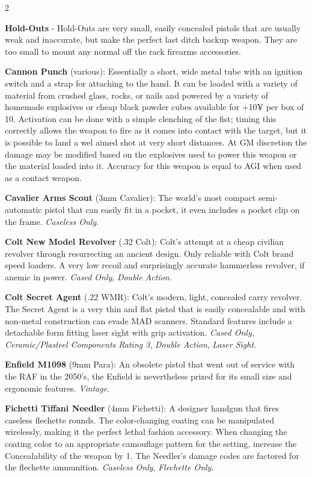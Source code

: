 \documentclass[
  oneside]{article}
\begin{document}
\begin{multicols}{2}

\textbf{Hold-Outs} - Hold-Outs are very small,
easily concealed pistols that are usually weak and
inaccurate, but make the perfect last ditch backup
weapon. They are too small to mount any normal off
the rack firearms accessories.

\textbf{Cannon Punch} (various): Essentially a
short, wide metal tube with an ignition switch and
a strap for attaching to the hand. It can be
loaded with a variety of material from crushed
glass, rocks, or nails and powered by a variety of
homemade explosives or cheap black powder cubes
available for +10¥ per box of 10. Activation can
be done with a simple clenching of the fist;
timing this correctly allows the weapon to fire as
it comes into contact with the target, but it is
possible to land a wel aimed shot at very short
distances. At GM discretion the damage may be
modified based on the explosives used to power
this weapon or the material loaded into it.
Accuracy for this weapon is equal to AGI when used
as a contact weapon.

\textbf{Cavalier Arms Scout} (3mm Cavalier): The
world's most compact semi-automatic pistol that
can easily fit in a pocket, it even includes a
pocket clip on the frame. \emph{Caseless Only}.

\textbf{Colt New Model Revolver} (.32 Colt):
Colt's attempt at a cheap civilian revolver
through resurrecting an ancient design. Only
reliable with Colt brand speed loaders. A very low
recoil and surprisingly accurate hammerless
revolver, if anemic in power. \emph{Cased Only},
\emph{Double Action}.

\textbf{Colt Secret Agent} (.22 WMR): Colt's
modern, light, concealed carry revolver. The
Secret Agent is a very thin and flat pistol that
is easily concealable and with non-metal
construction can evade MAD scanners. Standard
features include a detachable form fitting laser
sight with grip activation. \emph{Cased Only},
\emph{Ceramic/Plasteel Components Rating 3},
\emph{Double Action}, \emph{Laser Sight}.

\textbf{Enfield M1098} (9mm Para): An obsolete
pistol that went out of service with the RAF in
the 2050's, the Enfield is nevertheless prized for
its small size and ergonomic features.
\emph{Vintage}.

\textbf{Fichetti Tiffani Needler} (4mm Fichetti):
A designer handgun that fires caseless flechette
rounds. The color-changing coating can be
manipulated wirelessly, making it the perfect
lethal fashion accessory. When changing the
coating color to an appropriate camouflage pattern
for the setting, increase the Concealability of
the weapon by 1. The Needler's damage codes are
factored for the flechette ammunition.
\emph{Caseless Only}, \emph{Flechette Only}.


\end{multicols}
\end{document}
